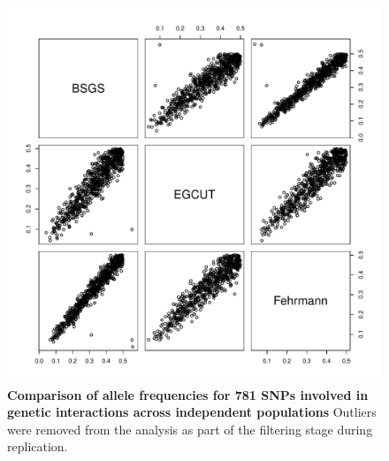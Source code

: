 \documentclass{article}
\begin{document}
\begin{figure}
	\centering
	\includegraphics[width=5in]{alleleFreq}
	\caption{\textbf{Comparison of allele frequencies for 781 SNPs involved in genetic interactions across independent populations} Outliers were removed from the analysis as part of the filtering stage during replication.}
	\label{fig:allelefreq}
\end{figure}
\end{document}
